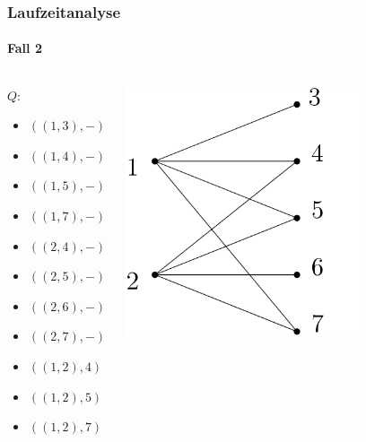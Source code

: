 \begin{frame}[t]
\frametitle{Laufzeitanalyse}
\framesubtitle{Fall 2}

\begin{columns}
	\begin{block}{$Q$:}
			\begin{itemize}
				\item $((1,3), -)$
				\item $((1,4), -)$
				\item $((1,5), -)$
				\item $((1,7), -)$
				\item $((2,4), -)$
				\item $((2,5), -)$
				\item $((2,6), -)$
				\item $((2,7), -)$
			
				\item $((1,2), 4)$
				\item $((1,2), 5)$
				\item $((1,2), 7)$
		\end{itemize}
	\end{block}

		\includegraphics[width=0.7\textwidth]{images/Graph_Queue_1.png}
\end{columns}
\end{frame}

